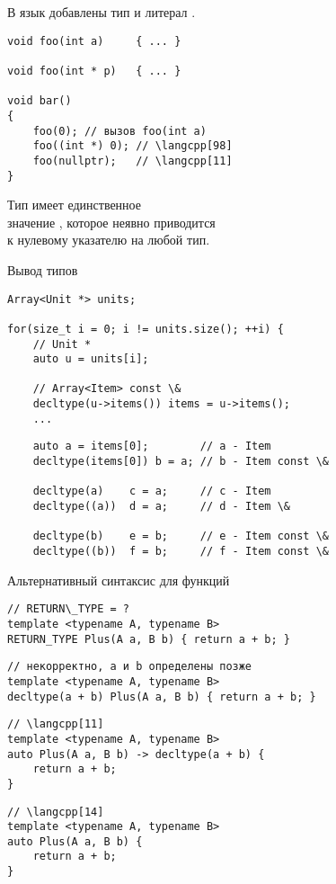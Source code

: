 \documentclass[aspectration=1610,t]{beamer}
\begin{document}
\begin{frame}[fragile]{}
    В язык добавлены тип  и литерал .

\begin{lstlisting}          
void foo(int a)     { ... }

void foo(int * p)   { ... }

void bar() 
{
    foo(0); // вызов foo(int a)
    foo((int *) 0); // \langcpp[98]
    foo(nullptr);   // \langcpp[11]
}
\end{lstlisting}
\medskip
Тип  имеет единственное \\значение ,
которое неявно приводится\\ к нулевому указателю на любой тип.
\end{frame}

\begin{frame}[fragile]{Вывод типов}
\begin{lstlisting}
Array<Unit *> units;

for(size_t i = 0; i != units.size(); ++i) {
    // Unit *
    auto u = units[i]; 	    
    
    // Array<Item> const \& 
    decltype(u->items()) items = u->items();
    ...
\end{lstlisting}
\pause
\begin{lstlisting}
    auto a = items[0];        // a - Item  
    decltype(items[0]) b = a; // b - Item const \& 
    
    decltype(a)    c = a;     // c - Item
    decltype((a))  d = a;     // d - Item \&

    decltype(b)    e = b;     // e - Item const \&
    decltype((b))  f = b;     // f - Item const \&
\end{lstlisting}
\end{frame}

\begin{frame}[fragile]{Альтернативный синтаксис для функций}
\begin{lstlisting}
// RETURN\_TYPE = ?
template <typename A, typename B> 
RETURN_TYPE Plus(A a, B b) { return a + b; }
\end{lstlisting}
\begin{lstlisting}
// некорректно, a и b определены позже
template <typename A, typename B> 
decltype(a + b) Plus(A a, B b) { return a + b; }
\end{lstlisting}
%
\begin{lstlisting}
// \langcpp[11]
template <typename A, typename B> 
auto Plus(A a, B b) -> decltype(a + b) { 
    return a + b; 
}
\end{lstlisting}
\begin{lstlisting}
// \langcpp[14]
template <typename A, typename B> 
auto Plus(A a, B b) {
    return a + b;
}
\end{lstlisting}
\end{frame}
\end{document}

